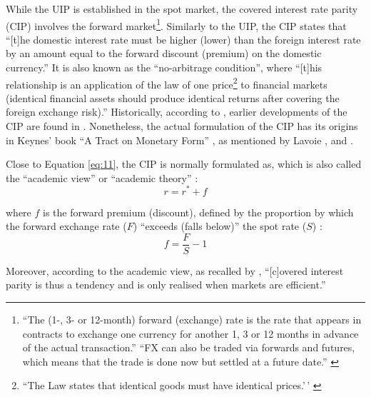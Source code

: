 \documentclass[a4paper, twoside]{templates/ociamthesis}
\begin{document}
While the UIP is established in the spot market, the covered interest rate parity (CIP) involves the forward market\footnote{``The (1-, 3- or 12-month) forward (exchange) rate is the rate that appears in contracts to exchange one currency for another 1, 3 or 12 months in advance of the actual transaction.'' \autocite[ 92]{copeland2014} ``FX can also be traded via forwards and futures, which means that the trade is done now but settled at a future date.'' \autocite[ 17]{donnelly2019}}. Similarly to the UIP, the CIP states that ``{[}t{]}he domestic interest rate must be higher (lower) than the foreign interest rate by an amount equal to the forward discount (premium) on the domestic currency.'' \autocite[ 94]{copeland2014} It is also known as the ``no-arbitrage condition'', where ``{[}t{]}his relationship is an application of the law of one price\footnote{``The Law states that identical goods must have identical prices.'\,' \autocite[ 191]{lamont2003}} to financial markets (identical financial assets should produce identical returns after covering the foreign exchange risk).'' \autocite[ 18]{moosa2003} Historically, according to \textcite[ 919]{du2018}, earlier developments of the CIP are found in \textcite{lotz1889}. Nonetheless, the actual formulation of the CIP has its origins in Keynes' book ``A Tract on Monetary Form'' \autocites[ 115--139]{keynes1923}{keynes1978c}, as mentioned by Lavoie \autocites*[ 164]{lavoie2000}[ 19]{lavoie2021}, \textcite[ 144]{mehrling2010} and \textcite[ 100]{bekaert2017}.

Close to Equation \eqref{eq:11}, the CIP is normally formulated as, which is also called the ``academic view'' or ``academic theory'' \autocite[ 19-20]{lavoie2021}:
\begin{equation}
r = r^* + f
\label{eq:13}
\end{equation}

\noindent where \(f\) is the forward premium (discount), defined by the proportion by which the forward exchange rate (\(F\)) ``exceeds (falls below)'' the spot rate (\(S\)) \autocite[ 94]{copeland2014}:
\begin{equation}
f = \frac{F}{S} - 1
\label{eq:14}
\end{equation}

Moreover, according to the academic view, as recalled by \textcite[ 19]{lavoie2021}, ``{[}c{]}overed interest parity is thus a tendency and is only realised when markets are efficient.''
\end{document}
